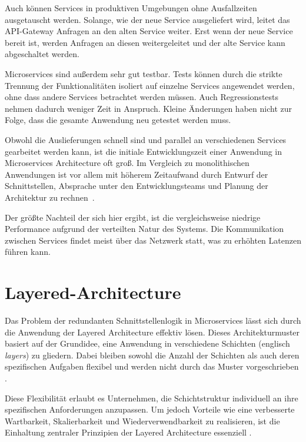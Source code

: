 \documentclass[acmtog]{acmart}
\begin{document}
Auch können Services in produktiven Umgebungen ohne Ausfallzeiten ausgetauscht werden.
Solange, wie der neue Service ausgeliefert wird, leitet das API-Gateway Anfragen an den alten Service weiter.
Erst wenn der neue Service bereit ist, werden Anfragen an diesen weitergeleitet und der alte Service kann abgeschaltet werden.

Microservices sind außerdem sehr gut testbar.
Tests können durch die strikte Trennung der Funktionalitäten isoliert auf einzelne Services angewendet werden, ohne dass andere Services betrachtet werden müssen.
Auch Regressionstests nehmen dadurch weniger Zeit in Anspruch.
Kleine Änderungen haben nicht zur Folge, dass die gesamte Anwendung neu getestet werden muss.

Obwohl die Auslieferungen schnell sind und parallel an verschiedenen Services gearbeitet werden kann, ist die initiale Entwicklungszeit einer Anwendung in Microservices Architecture oft groß.
Im Vergleich zu monolithischen Anwendungen ist vor allem mit höherem Zeitaufwand durch Entwurf der Schnittstellen, Absprache unter den Entwicklungsteams und Planung der Architektur zu rechnen~\cite[6-7]{evolutionOfDistributedSystems}.

Der größte Nachteil der sich hier ergibt, ist die vergleichsweise niedrige Performance aufgrund der verteilten Natur des Systems.
Die Kommunikation zwischen Services findet meist über das Netzwerk statt, was zu erhöhten Latenzen führen kann\cite[34]{architecturePatterns}.

\section{Layered-Architecture}
\label{sec:layered}
Das Problem der redundanten Schnittstellenlogik in Microservices lässt sich durch die
Anwendung der Layered Architecture effektiv lösen. Dieses Architekturmuster basiert auf
der Grundidee, eine Anwendung in verschiedene Schichten (englisch \textit{layers})
zu gliedern. Dabei bleiben sowohl die Anzahl der Schichten als auch deren spezifischen
Aufgaben flexibel und werden nicht durch das Muster vorgeschrieben \cite[34]{layered2}.

Diese Flexibilität erlaubt es Unternehmen, die Schichtstruktur individuell an ihre
spezifischen Anforderungen anzupassen. Um jedoch Vorteile wie eine verbesserte Wartbarkeit,
Skalierbarkeit und Wiederverwendbarkeit zu realisieren, ist die Einhaltung zentraler
Prinzipien der Layered Architecture essenziell \cite[34]{layered2}.
\end{document}
